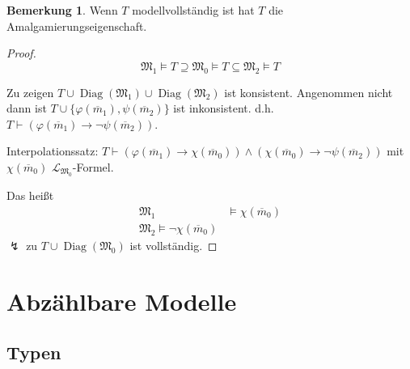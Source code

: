 \documentclass[12pt,parskip=full]{scrartcl}
\theoremstyle{definition}
\newtheorem{remark}[theorem]{Bemerkung}
\begin{document}
 	\begin{remark}
 		Wenn $T$ modellvollständig ist hat $T$ die Amalgamierungseigenschaft.
 	\end{remark}
 
 	\begin{proof}
 		\begin{equation*}
	 		\mathfrak{M_1} \models T \supseteq \mathfrak{M_0} \models T \subseteq \mathfrak{M_2} \models T
 		\end{equation*}
 		
 		Zu zeigen $T \cup \operatorname{Diag}(\mathfrak{M_1}) \cup \operatorname{Diag}(\mathfrak{M_2})$ ist konsistent. Angenommen nicht dann ist $T \cup \{ \varphi(\overline{m}_1), \psi(\overline{m}_2) \}$ ist inkonsistent. d.h. $T \vdash (\varphi(\overline{m}_1) \rightarrow \lnot \psi(\overline{m}_2))$.
 		
 		Interpolationssatz: $T \vdash (\varphi(\overline{m}_1) \rightarrow \chi(\overline{m}_0)) \land (\chi(\overline{m}_0) \rightarrow \lnot \psi(\overline{m}_2))$ mit $\chi(\overline{m}_0)$ $\mathcal{L}_{\mathfrak{M_0}}$-Formel.
 		
 		Das heißt
 		\begin{align*}
	 		\mathfrak{M_1} &\models \chi(\overline{m}_0) \\
	 		\mathfrak{M_2} \models \lnot \chi(\overline{m}_0)
 		\end{align*}
 		$\lightning$ zu $T \cup \operatorname{Diag}(\mathfrak{M_0})$ ist vollständig.
 	\end{proof}
 
 	\section{Abzählbare Modelle}
 	
 	\subsection{Typen}
 	
\end{document}
